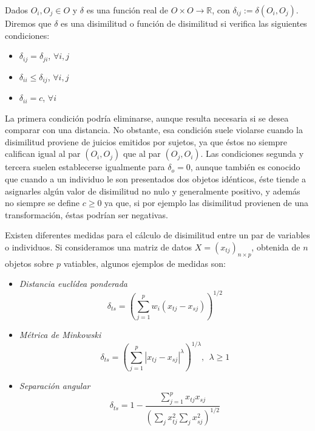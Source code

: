 \documentclass[12pt,oneside]{book}\usepackage[]{graphicx}\usepackage[]{color}
\theoremstyle{definition} %
\begin{document}
\begin{defin}
Dados $O_i, O_j \in O$ y $\delta$ es una función real de $O \times O \rightarrow \mathbb{R}$, con $\delta_{ij}:=\delta(O_i,O_j)$. Diremos que $\delta$ es una disimilitud o función de disimilitud si verifica las siguientes condiciones:
\begin{itemize}
\item $\delta_{ij}=\delta_{ji}$, $\forall i,j$
\item $\delta_{ii} \leq \delta_{ij}$, $\forall i,j$
\item $\delta_{ii}= c$, $\forall i$
\end{itemize}
\end{defin}

La primera condición podría eliminarse, aunque resulta necesaria si se desea comparar con una distancia. No obstante, esa condición suele violarse cuando la disimilitud proviene de juicios emitidos por sujetos, ya que éstos no siempre califican igual al par $(O_i,O_j)$ que al par $(O_j,O_i)$. Las condiciones segunda y tercera suelen establecerse igualmente para $\delta_o=0$, aunque también es conocido que cuando a un individuo le son presentados dos objetos idénticos, éste tiende a asignarles algún valor de disimilitud no nulo y generalmente positivo, y además no siempre se define $c \geq 0$ ya que, si por ejemplo las disimilitud provienen de una transformación, éstas podrían ser negativas.

Existen diferentes medidas para el cálculo de disimilitud entre un par de variables o individuos. Si consideramos una matriz de datos $X=(x_{tj})_{n\times p}$, obtenida de $n$ objetos sobre $p$ vatiables, algunos ejemplos de medidas son:

\begin{itemize}
\item \textit{Distancia euclídea ponderada}
$$ \delta_{ts}=\left(\displaystyle \sum_{j=1}^p w_i(x_{tj}-x_{sj}) \right)^{1/2} $$
\item \textit{Métrica de Minkowski}
$$ \delta_{ts}=\left(\displaystyle \sum_{j=1}^p |x_{tj}-x_{sj}|^{\lambda}\right)^{1/\lambda}, \ \ \lambda \geq 1 $$
\item \textit{Separación angular}
$$ \delta_{ts}=1-\frac{\sum_{j=1}^p x_{tj}x_{sj}}{(\sum_j x_{tj}^2 \sum_j x_{sj}^2)^{1/2}} $$

\end{itemize}
\end{document}
